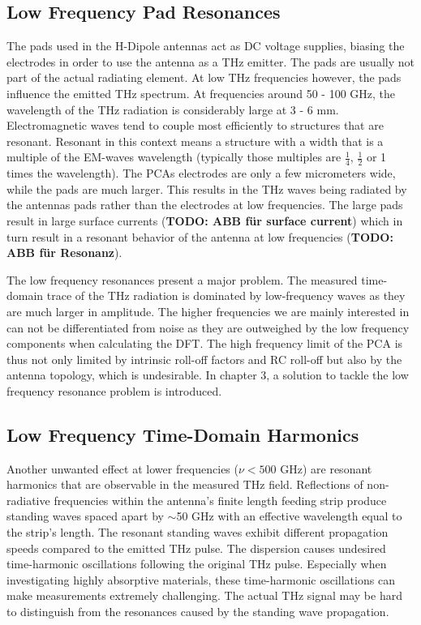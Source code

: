 \subsection{Low Frequency Pad Resonances}
The pads used in the H-Dipole antennas act as DC voltage supplies, biasing the electrodes in order to use the antenna as a THz emitter. The pads are usually not part of the actual radiating element. At low THz frequencies however, the pads influence the emitted THz spectrum. At frequencies around \num{50} - \num{100} \si{\giga \hertz}, the wavelength of the THz radiation is considerably large at \num{3} - \num{6} \si{\milli \meter}. Electromagnetic waves tend to couple most efficiently to structures that are resonant. Resonant in this context means a structure with a width that is a multiple of the EM-waves wavelength (typically those multiples are $\frac{1}{4}$, $\frac{1}{2}$ or \num{1} times the wavelength). The PCAs electrodes are only a few micrometers wide, while the pads are much larger. This results in the THz waves being radiated by the antennas pads rather than the electrodes at low frequencies. The large pads result in large surface currents (\textbf{TODO: ABB für surface current}) which in turn result in a resonant behavior of the antenna at low frequencies (\textbf{TODO: ABB für Resonanz}). 

The low frequency resonances present a major problem. The measured time-domain trace of the THz radiation is dominated by low-frequency waves as they are much larger in amplitude. The higher frequencies we are mainly interested in can not be differentiated from noise as they are outweighed by the low frequency components when calculating the DFT. The high frequency limit of the PCA is thus not only limited by intrinsic roll-off factors and RC roll-off but also by the antenna topology, which is undesirable. In chapter 3, a solution to tackle the low frequency resonance problem is introduced.

\subsection{Low Frequency Time-Domain Harmonics}
Another unwanted effect at lower frequencies ($\nu < 500$ \si{\giga \hertz}) are resonant harmonics that are observable in the measured THz field. Reflections of non-radiative frequencies within the antenna's finite length feeding strip produce standing waves spaced apart by $\sim$\num{50} \si{\giga \hertz} with an effective wavelength equal to the strip's length. The resonant standing waves exhibit different propagation speeds compared to the emitted THz pulse. The dispersion causes undesired time-harmonic oscillations following the original THz pulse. Especially when investigating highly absorptive materials, these time-harmonic oscillations can make measurements extremely challenging. The actual THz signal may be hard to distinguish from the resonances caused by the standing wave propagation. 

